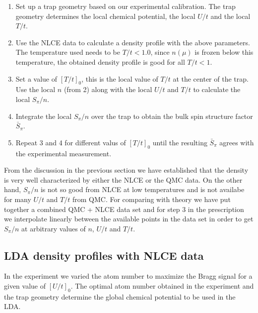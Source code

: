 \documentclass[11pt,letter]{article}
\begin{document}
\begin{enumerate}

  \item Set up a trap geometry based on our experimental calibration.  The trap
geometry determines the local chemical potential, the local $U/t$ and the local
$T/t$. 

  \item Use the NLCE data to calculate a density profile with the above
parameters.  The temperature used needs to be $T/t < 1.0$, since $n(\mu)$ is
frozen below this temperature, the obtained density profile is good for all
$T/t<1$. 

  \item Set a value of $[T/t]_{0}$, this is the local value of $T/t$ at the center of the trap.  Use the local $n$ (from 2) along with the local $U/t$ and $T/t$ to calculate the local $S_{\pi}/n$.   
 
  \item Integrate the local $S_{\pi}/n$ over the trap to obtain the bulk spin structure factor $\bar{S}_{\pi}$. 

  \item Repeat 3 and 4 for different valus of $[T/t]_{0}$ until the resulting  $\bar{S}_{\pi}$ agrees with the experimental measurement. 
\end{enumerate}

From the discussion in the previous section we have established that the
density is very well characterized by either the NLCE or the QMC data.   On the
other hand, $S_{\pi}/n$ is not so good from NLCE at low temperatures and is not
availabe for many $U/t$ and $T/t$ from QMC.    For comparing with theory we
have put together a combined QMC + NLCE data set and for step 3 in the
prescription we interpolate linearly between the available points in the data
set in order to get $S_{\pi}/n$ at arbitrary values of $n$, $U/t$ and $T/t$.

\subsection{ LDA density profiles with NLCE data}

In the experiment we varied the atom number to maximize the Bragg signal for a
given value of $[U/t]_{0}$.   The optimal atom number obtained in the
experiment and the trap geometry determine the global chemical potential to be
used in the LDA.




 
 

 
 
\end{document}
